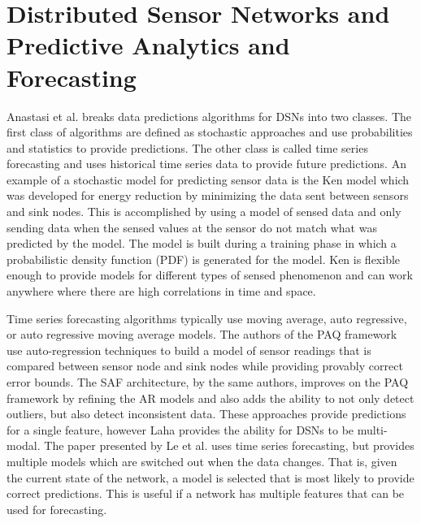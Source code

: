 \section{Distributed Sensor Networks and Predictive Analytics and Forecasting}\label{sec:distributed-sensor-networks-and-predictive-analytics-and-forecasting}
Anastasi et al.\cite{anastasi_energy_2009} breaks data predictions algorithms for DSNs into two classes. The first class of algorithms are defined as stochastic approaches and use probabilities and statistics to provide predictions. The other class is called time series forecasting and uses historical time series data to provide future predictions. An example of a stochastic model for predicting sensor data is the Ken model\cite{chu2006approximate} which was developed for energy reduction by minimizing the data sent between sensors and sink nodes. This is accomplished by using a model of sensed data and only sending data when the sensed values at the sensor do not match what was predicted by the model. The model is built during a training phase in which a probabilistic density function (PDF) is generated for the model. Ken is flexible enough to provide models for different types of sensed phenomenon and can work anywhere where there are high correlations in time and space.

Time series forecasting algorithms typically use moving average, auto regressive, or auto regressive moving average models. The authors of the PAQ framework\cite{tulone2006paq} use auto-regression techniques to build a model of sensor readings that is compared between sensor node and sink nodes while  providing provably correct error bounds. The SAF architecture\cite{tulone2006energy}, by the same authors, improves on the PAQ framework by refining the AR models and also adds the ability to not only detect outliers, but also detect inconsistent data. These approaches provide predictions for a single feature, however Laha provides the ability for DSNs to be multi-modal. The paper presented by Le et al.\cite{le2007adaptive} uses time series forecasting, but provides multiple models which are switched out when the data changes. That is, given the current state of the network, a model is selected that is most likely to provide correct predictions. This is useful if a network has multiple features that can be used for forecasting.


